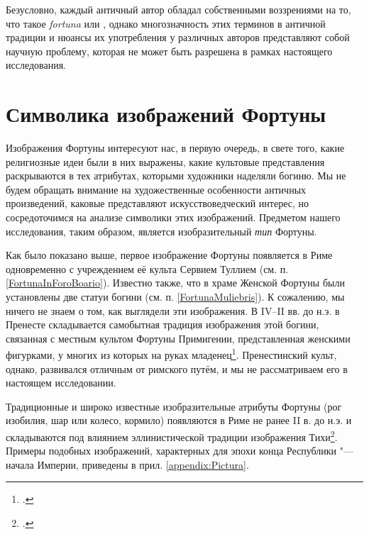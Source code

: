 Безусловно, каждый античный автор обладал собственными воззрениями на то, что такое \textit{fortuna} или , однако многозначность этих терминов в античной традиции и нюансы их употребления у различных авторов представляют собой научную проблему, которая не может быть разрешена в рамках настоящего исследования.


\section{Символика изображений Фортуны}

Изображения Фортуны интересуют нас, в первую очередь, в свете того, какие религиозные идеи были в них выражены, какие культовые представления раскрываются в тех атрибутах, которыми художники наделяли богиню. Мы не будем обращать внимание на художественные особенности античных произведений, каковые представляют искусствоведческий интерес, но сосредоточимся на анализе символики этих изображений. Предметом нашего исследования, таким образом, является изобразительный \textit{тип} Фортуны.

Как было показано выше, первое изображение Фортуны появляется в Риме одновременно с учреждением её культа Сервием Туллием (см. п. \ref{FortunaInForoBoario}). Известно также, что в храме Женской Фортуны были установлены две статуи богини (см. п. \ref{FortunaMuliebris}). К сожалению, мы ничего не знаем о том, как выглядели эти изображения. В IV--II вв. до н.э. в Пренесте складывается самобытная традиция изображения этой богини, связанная с местным культом Фортуны Примигении, представленная женскими фигурками, у многих из которых на руках младенец\footcite[Pp. 40--43, Pl. V]{Champeaux1982}. Пренестинский культ, однако, развивался отличным от римского путём, и мы не рассматриваем его в настоящем исследовании.

Традиционные и широко известные изобразительные атрибуты Фортуны (рог изобилия, шар или колесо, кормило) появляются в Риме не ранее II в. до н.э. и складываются под влиянием эллинистической традиции изображения Тихи\footcite[P. 68--69]{Arya2002}. Примеры подобных изображений, характерных для эпохи конца Республики "--- начала Империи, приведены в прил. \ref{appendix:Pictura}.



